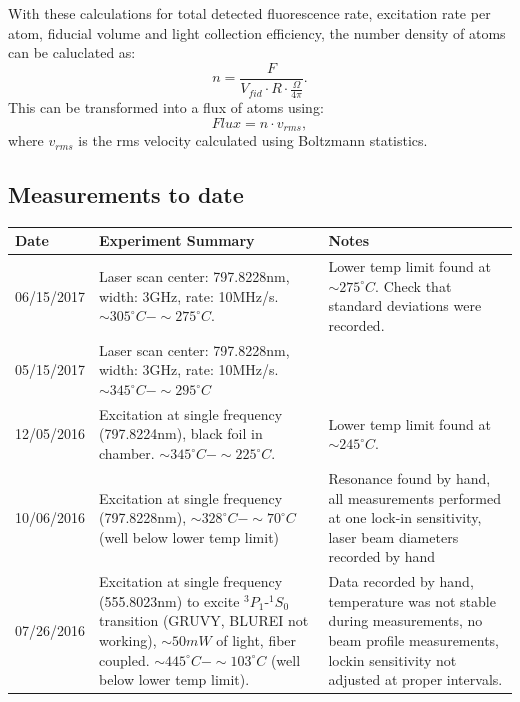 \documentclass[12pt, a4paper]{article}
\begin{document}
With these calculations for total detected fluorescence rate, excitation rate per atom, fiducial volume and light collection efficiency, the number density of atoms can be caluclated as:
\begin{equation}
n = \frac{F}{V_{fid}\cdot R \cdot \frac{\Omega}{4\pi} }.
\end{equation}
This can be transformed into a flux of atoms using:
\begin{equation}
Flux = n\cdot v_{rms},
\end{equation}
where $v_{rms}$ is the rms velocity calculated using Boltzmann statistics.


\subsection{Measurements to date}
\begin{center}
\begin{table}[!h]
\begin{tabular}{||p{2cm}|p{8cm}|p{5cm}||}
\hline
Date & Experiment Summary & Notes\\
\hline\hline
06/15/2017 & Laser scan center: 797.8228nm, width: 3GHz, rate: 10MHz/s. $\sim305^{\circ}C-\sim275^{\circ}C$. &  Lower temp limit found at $\sim275^{\circ}C$. Check that standard deviations were recorded.\\
\hline
05/15/2017 & Laser scan center: 797.8228nm, width: 3GHz, rate: 10MHz/s. $\sim345^{\circ}C-\sim295^{\circ}C$ & \\
\hline 
12/05/2016 & Excitation at single frequency (797.8224nm), black foil in chamber. $\sim345^{\circ}C-\sim225^{\circ}C$. &  Lower temp limit found at $\sim245^{\circ}C$. \\
\hline
10/06/2016 & Excitation at single frequency (797.8228nm), $\sim328^{\circ}C-\sim70^{\circ}C$ (well below lower temp limit) & Resonance found by hand, all measurements performed at one lock-in sensitivity, laser beam diameters recorded by hand\\
\hline
07/26/2016 & Excitation at single frequency (555.8023nm) to excite $^{3}P_{1}$-$ ^{1}S_{0}$ transition (GRUVY, BLUREI not working), $\sim50mW$ of light, fiber coupled. $\sim445^{\circ}C-\sim103^{\circ}C$ (well below lower temp limit). & Data recorded by hand, temperature was not stable during measurements, no beam profile measurements, lockin sensitivity not adjusted at proper intervals.\\
\hline
\end{tabular}
\end{table}
\end{center}
\end{document}

